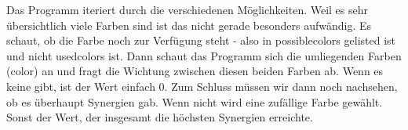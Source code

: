 \documentclass{article}
\begin{document}
Das Programm iteriert durch die verschiedenen Möglichkeiten. Weil es sehr übersichtlich viele Farben sind ist das nicht gerade besonders aufwändig. Es schaut, ob die Farbe noch zur Verfügung steht - also in possiblecolors gelisted ist und nicht usedcolors ist. Dann schaut das Programm sich die umliegenden Farben (color) an und fragt die Wichtung zwischen diesen beiden Farben ab. Wenn es keine gibt, ist der Wert einfach 0. Zum Schluss müssen wir dann noch nachsehen, ob es überhaupt Synergien gab. Wenn nicht  wird eine zufällige Farbe gewählt. Sonst der Wert, der insgesamt die höchsten Synergien erreichte.
\end{document}
